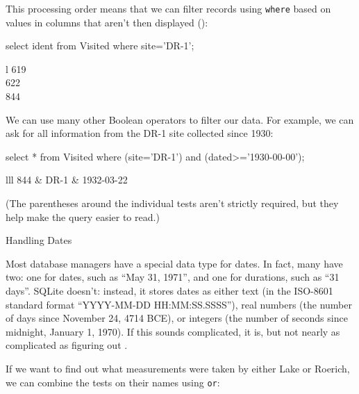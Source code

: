 This processing order means that we can filter records using
\texttt{where} based on values in columns that aren't then displayed
():

\begin{VerbIn}
select ident from Visited where site='DR-1';
\end{VerbIn}

\begin{sqltable}{l}
619 \\
622 \\
844 \\
\end{sqltable}


We can use many other Boolean operators to filter our data. For example,
we can ask for all information from the DR-1 site collected since 1930:

\begin{VerbIn}
select * from Visited where (site='DR-1') and (dated>='1930-00-00');
\end{VerbIn}

\begin{sqltable}{lll}
844 & DR-1 & 1932-03-22 \\
\end{sqltable}

(The parentheses around the individual tests aren't strictly required,
but they help make the query easier to read.)

\begin{swcbox}{Handling Dates}

Most database managers have a special data type for dates. In fact, many
have two: one for dates, such as ``May 31, 1971'', and one for
durations, such as ``31 days''. SQLite doesn't: instead, it stores dates
as either text (in the ISO-8601 standard format ``YYYY-MM-DD
HH:MM:SS.SSSS''), real numbers (the number of days since November 24,
4714 BCE), or integers (the number of seconds since midnight, January 1,
1970). If this sounds complicated, it is, but not nearly as complicated
as figuring out
.

\end{swcbox}

If we want to find out what measurements were taken by either Lake or
Roerich, we can combine the tests on their names using \texttt{or}:

